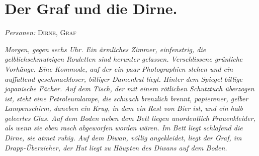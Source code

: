 \documentclass[
	final,
	a4paper,
	ngerman,
	mpinclude = true, %
	twoside = true,
	open = right,
	cleardoublepage = plain,
	DIV = 13,
	BCOR = 1cm,
	titlepage = firstiscover,
	]{scrbook}
\newcommand{\scene}{\section}
\newcommand{\setting}[1]{\vspace{-0.5\baselineskip}\centering\textit{#1}}
\newcommand{\characterlist}[1]{{\begin{center}\textit{Personen:} #1\end{center}}}
\newcommand{\thecharacter}[1]{\textup{\textsc{#1}}}
\newcommand{\thedirne}{\thecharacter{Dirne}}
\newcommand{\thegraf}{\thecharacter{Graf}}
\begin{document}
\scene{Der Graf und die Dirne.}
\characterlist{\thedirne, \thegraf}
\setting{Morgen, gegen sechs Uhr. Ein ärmliches Zimmer, einfenstrig, die gelblichschmutzigen Rouletten sind herunter gelassen. Verschlissene grünliche Vorhänge. Eine Kommode, auf der ein paar Photographien stehen und ein auffallend geschmackloser, billiger Damenhut liegt. Hinter dem Spiegel billige japanische Fächer. Auf dem Tisch, der mit einem rötlichen Schutztuch überzogen ist, steht eine Petroleumlampe, die schwach brenzlich brennt, papierener, gelber Lampenschirm, daneben ein Krug, in dem ein Rest von Bier ist, und ein halb geleertes Glas. Auf dem Boden neben dem Bett liegen unordentlich Frauenkleider, als wenn sie eben rasch abgeworfen worden wären. Im Bett liegt schlafend die Dirne, sie atmet ruhig. Auf dem Diwan, völlig angekleidet, liegt der Graf, im Drapp-Überzieher, der Hut liegt zu Häupten des Diwans auf dem Boden.}
\end{document}
